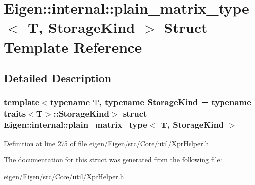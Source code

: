 \hypertarget{struct_eigen_1_1internal_1_1plain__matrix__type}{}\section{Eigen\+:\+:internal\+:\+:plain\+\_\+matrix\+\_\+type$<$ T, Storage\+Kind $>$ Struct Template Reference}
\label{struct_eigen_1_1internal_1_1plain__matrix__type}


\subsection{Detailed Description}
\subsubsection*{template$<$typename T, typename Storage\+Kind = typename traits$<$\+T$>$\+::\+Storage\+Kind$>$\newline
struct Eigen\+::internal\+::plain\+\_\+matrix\+\_\+type$<$ T, Storage\+Kind $>$}



Definition at line \hyperlink{eigen_2_eigen_2src_2_core_2util_2_xpr_helper_8h_source_l00275}{275} of file \hyperlink{eigen_2_eigen_2src_2_core_2util_2_xpr_helper_8h_source}{eigen/\+Eigen/src/\+Core/util/\+Xpr\+Helper.\+h}.



The documentation for this struct was generated from the following file\+:\begin{DoxyCompactItemize}
\item 
eigen/\+Eigen/src/\+Core/util/\+Xpr\+Helper.\+h\end{DoxyCompactItemize}
